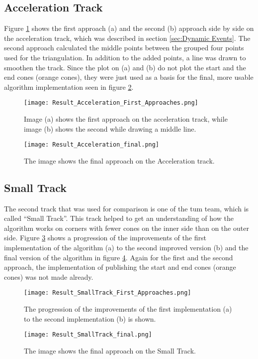 \subsection{Acceleration Track} \label{sec:Results Acceleration Track}
Figure \ref{fig:Result Acceleration First Approaches} shows the first approach (a) and the second (b) approach side by side on the acceleration track, which was described in section \ref{sec:Dynamic Events}. The second approach calculated the middle points between the grouped four points used for the triangulation. In addition to the added points, a line was drawn to smoothen the track. Since the plot on (a) and (b) do not plot the start and the end cones (orange cones), they were just used as a basis for the final, more usable algorithm implementation seen in figure \ref{fig:Result Acceleration Final}.
\begin{figure}[H]
    \centering
    \texttt{[image: Result\_Acceleration\_First\_Approaches.png]}
    \caption{Image (a) shows the first approach on the acceleration track, while image (b) shows the second while drawing a middle line.}
    \label{fig:Result Acceleration First Approaches}
\end{figure}
\begin{figure}[H]
    \centering
    \texttt{[image: Result\_Acceleration\_final.png]}
    \caption{The image shows the final approach on the Acceleration track.}
    \label{fig:Result Acceleration Final}
\end{figure}

\subsection{Small Track} \label{sec:Results Small Track}
The second track that was used for comparison is one of the \acrlong{tum} team, which is called ``Small Track''. \cite{tumftm_optimization_algoritm} This track helped to get an understanding of how the algorithm works on corners with fewer cones on the inner side than on the outer side. Figure \ref{fig:Result Small Track First Approaches} shows a progression of the improvements of the first implementation of the algorithm (a) to the second improved version (b) and the final version of the algorithm in figure \ref{fig:Result Small Track Final}. Again for the first and the second approach, the implementation of publishing the start and end cones (orange cones) was not made already.
\begin{figure}[H]
    \centering
    \texttt{[image: Result\_SmallTrack\_First\_Approaches.png]}
    \caption{The progression of the improvements of the first implementation (a) to the second implementation (b) is shown.}
    \label{fig:Result Small Track First Approaches}
\end{figure}
\begin{figure}[H]
    \centering
    \texttt{[image: Result\_SmallTrack\_final.png]}
    \caption{The image shows the final approach on the Small Track.}
    \label{fig:Result Small Track Final}
\end{figure}


